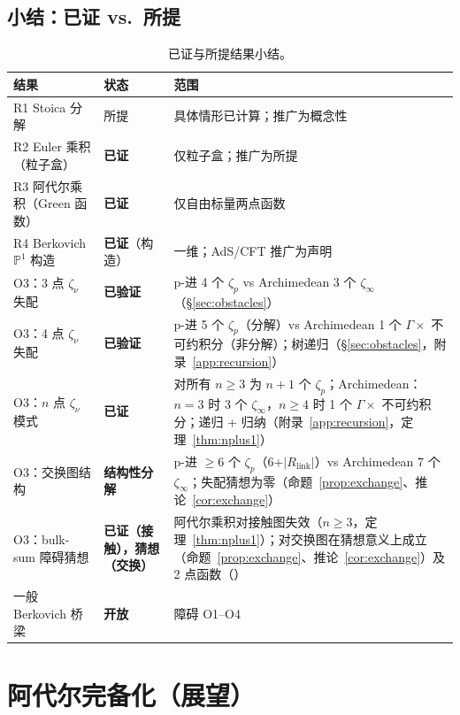 \documentclass[11pt,a4paper]{ctexart}
\theoremstyle{remark}
\newcommand{\Pone}{\mathbb{P}^1}
\begin{document}
\subsection{小结：已证 vs.\ 所提}

\begin{table}[H]
\centering
\caption{已证与所提结果小结。}
\label{tab:summary}
\begin{tabular}{lll}
\toprule
结果 & 状态 & 范围 \\
\midrule
R1 Stoica 分解 & 所提 & 具体情形已计算；推广为概念性 \\
R2 Euler 乘积（粒子盒） & \textbf{已证} & 仅粒子盒；推广为所提 \\
R3 阿代尔乘积（Green 函数） & \textbf{已证} & 仅自由标量两点函数 \\
R4 Berkovich $\Pone$ 构造 & \textbf{已证}（构造） & 一维；AdS/CFT 推广为声明 \\
O3：3 点 $\zeta_\nu$ 失配 & \textbf{已验证} & p-进 4 个 $\zeta_p$ vs Archimedean 3 个 $\zeta_\infty$（\S\ref{sec:obstacles}） \\
O3：4 点 $\zeta_\nu$ 失配 & \textbf{已验证} & p-进 5 个 $\zeta_p$（分解）vs Archimedean 1 个 $\Gamma \times$ 不可约积分（非分解）；树递归（\S\ref{sec:obstacles}，附录~\ref{app:recursion}） \\
O3：$n$ 点 $\zeta_\nu$ 模式 & \textbf{已证} & 对所有 $n \geq 3$ 为 $n{+}1$ 个 $\zeta_p$；Archimedean：$n=3$ 时 3 个 $\zeta_\infty$，$n \geq 4$ 时 1 个 $\Gamma \times$ 不可约积分；递归 + 归纳（附录~\ref{app:recursion}，定理~\ref{thm:nplus1}） \\
O3：交换图结构 & \textbf{结构性分解} & p-进 $\geq 6$ 个 $\zeta_p$（6+$|R_{\mathrm{link}}|$）vs Archimedean 7 个 $\zeta_\infty$；失配猜想为零（命题~\ref{prop:exchange}、推论~\ref{cor:exchange}） \\
O3：bulk-sum 障碍猜想 & \textbf{已证（接触），猜想（交换）} & 阿代尔乘积对接触图失效（$n \geq 3$，定理~\ref{thm:nplus1}）；对交换图在猜想意义上成立（命题~\ref{prop:exchange}、推论~\ref{cor:exchange}）及 2 点函数（\cite{HSYZ20}） \\
一般 Berkovich 桥梁 & \textbf{开放} & 障碍 O1--O4 \\
\bottomrule
\end{tabular}
\end{table}

\section{阿代尔完备化（展望）}
\label{sec:adelic}
\end{document}
